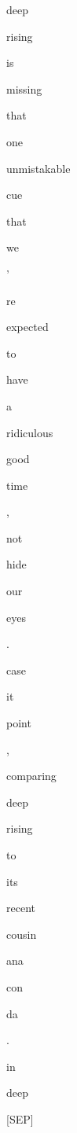 \documentclass[varwidth=150mm]{standalone}
\begin{document}
\begin{CJK*}{UTF8}{gbsn}
{{{\colorbox{red!21.94270133972168}{\strut deep} \colorbox{red!7.919487476348877}{\strut rising} \colorbox{red!4.553786754608154}{\strut is} \colorbox{red!9.775607109069824}{\strut missing} \colorbox{red!5.5121846199035645}{\strut that} \colorbox{red!2.9824135303497314}{\strut one} \colorbox{red!15.372950553894043}{\strut unmistakable} \colorbox{red!7.165223598480225}{\strut cue} \colorbox{red!5.260205268859863}{\strut that} \colorbox{red!8.136383056640625}{\strut we} \colorbox{red!0.0}{\strut '} \colorbox{red!1.5186083316802979}{\strut re} \colorbox{red!8.562185287475586}{\strut expected} \colorbox{red!6.830081462860107}{\strut to} \colorbox{red!1.010308027267456}{\strut have} \colorbox{red!1.3013036251068115}{\strut a} \colorbox{red!4.375326633453369}{\strut ridiculous} \colorbox{red!1.3819571733474731}{\strut good} \colorbox{red!2.1301193237304688}{\strut time} \colorbox{red!0.0}{\strut ,} \colorbox{red!0.0}{\strut not} \colorbox{red!6.149248123168945}{\strut hide} \colorbox{red!2.120985746383667}{\strut our} \colorbox{red!3.49412202835083}{\strut eyes} \colorbox{red!0.0}{\strut .} \colorbox{red!1.4227768182754517}{\strut case} \colorbox{red!1.9233548641204834}{\strut it} \colorbox{red!0.0}{\strut point} \colorbox{red!0.0}{\strut ,} \colorbox{red!9.574285507202148}{\strut comparing} \colorbox{red!22.882566452026367}{\strut deep} \colorbox{red!9.148480415344238}{\strut rising} \colorbox{red!6.664524078369141}{\strut to} \colorbox{red!6.410637855529785}{\strut its} \colorbox{red!4.6290507316589355}{\strut recent} \colorbox{red!6.003247261047363}{\strut cousin} \colorbox{red!4.435231685638428}{\strut ana}\colorbox{red!5.2261176109313965}{\strut con}\colorbox{red!10.953113555908203}{\strut da} \colorbox{red!0.0}{\strut .} \colorbox{red!4.499810218811035}{\strut in} \colorbox{red!58.645198822021484}{\strut deep} \colorbox{red!2.18084979057312}{\strut [SEP]}
}}}
\end{CJK*}
\end{document}
